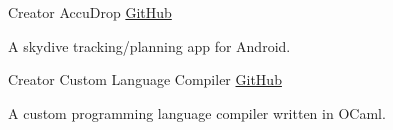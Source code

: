 \begin{cventries}

  \vspace{-3.0mm}
  \begin{minipage}{0.45\textwidth}
  \cventry
    {Creator} %
    {AccuDrop} %
    {\href{https://github.com/ChrisLane/accudrop}{GitHub}} %
    {} %
    {
      \begin{cvitems} %
      \item {A skydive tracking/planning app for Android.}
      \end{cvitems}
    }
  \end{minipage}%
  \hspace*{0.05\textwidth}
  \begin{minipage}{0.5\textwidth}
  \cventry
    {Creator} %
    {Custom Language Compiler} %
    {\href{https://github.com/ChrisLane/custom-lang-compiler}{GitHub}} %
    {} %
    {
      \begin{cvitems} %
      \item {A custom programming language compiler written in OCaml.}
      \end{cvitems}
    }
  \end{minipage}


\end{cventries}
